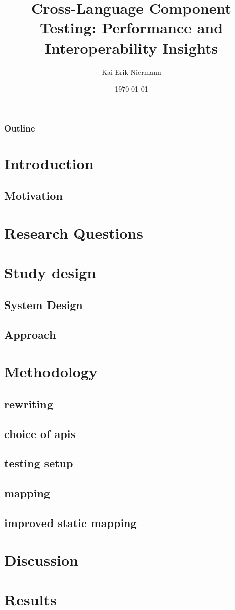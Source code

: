 \documentclass{beamer}
\title{Cross-Language Component Testing: Performance and Interoperability Insights}
\author{Kai Erik Niermann}
\date{\today}
\begin{document}
\frame{\titlepage}

\begin{frame}
\frametitle{Outline}
\tableofcontents
\end{frame}

\section{Introduction}

\subsection{Motivation}
 

\section{Research Questions}


\section{Study design}
\subsection{System Design}

\subsection{Approach}


\section{Methodology}
\subsection{rewriting}

\subsection{choice of apis}

\subsection{testing setup}


\subsection{mapping}


\subsection{improved static mapping}


\section{Discussion}



\section{Results}



\end{document}
